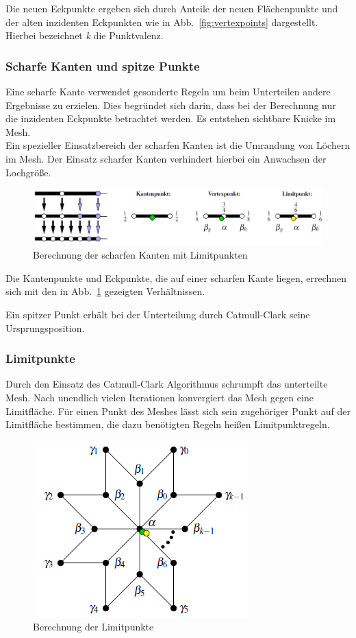 Die neuen Eckpunkte ergeben sich durch Anteile der neuen Flächenpunkte und der alten inzidenten Eckpunkten wie in Abb.~\ref{fig:vertexpoints} dargestellt. Hierbei bezeichnet \emph{k} die Punktvalenz.

\subsubsection{Scharfe Kanten und spitze Punkte}
\label{sec:sharpEdge}
Eine scharfe Kante verwendet gesonderte Regeln um beim Unterteilen andere Ergebnisse zu erzielen. Dies begründet sich darin, dass bei der Berechnung nur die inzidenten Eckpunkte betrachtet werden. Es entstehen sichtbare Knicke im Mesh. \\

Ein spezieller Einsatzbereich der scharfen Kanten ist die Umrandung von Löchern im Mesh. Der Einsatz scharfer Kanten verhindert hierbei ein Anwachsen der Lochgröße.
\begin{figure}[htpb]
\centering
\includegraphics[width=\columnwidth]{content/pictures/sharpLimit.png}
\caption{Berechnung der scharfen Kanten mit Limitpunkten}
\label{fig:sharpLimit}
\end{figure}
Die Kantenpunkte und Eckpunkte, die auf einer scharfen Kante liegen, errechnen sich mit den in Abb.~\ref{fig:sharpLimit} gezeigten Verhältnissen. 

Ein spitzer Punkt erhält bei der Unterteilung durch Catmull-Clark seine Ursprungsposition.

\subsubsection{Limitpunkte}
Durch den Einsatz des Catmull-Clark Algorithmus schrumpft das unterteilte Mesh. Nach unendlich vielen Iterationen konvergiert das Mesh gegen eine Limitfläche. 
Für einen Punkt des Meshes lässt sich sein zugehöriger Punkt auf der Limitfläche bestimmen, die dazu benötigten Regeln heißen Limitpunktregeln.
\begin{figure}[htpb]
\centering
\includegraphics[scale=0.7]{content/pictures/limit.png}
\caption{Berechnung der Limitpunkte}
\label{fig:limit}
\end{figure}

